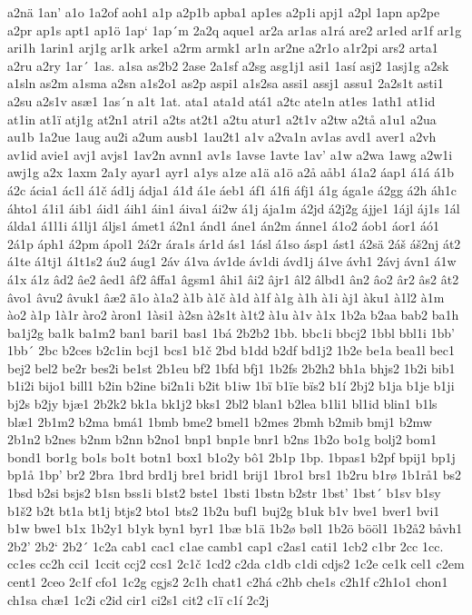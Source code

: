 a2nä
1an'
a1o
1a2of
aoh1
a1p
a2p1b
apba1
ap1es
a2p1i
apj1
a2pl
1apn
ap2pe
a2pr
ap1s
apt1
ap1ö
1ap`
1ap´m
2a2q
aque1
ar2a
ar1as
a1rá
are2
ar1ed
ar1f
ar1g
ari1h
1arin1
arj1g
ar1k
arke1
a2rm
armk1
ar1n
ar2ne
a2r1o
a1r2pi
ars2
arta1
a2ru
a2ry
1ar´
1as.
a1sa
as2b2
2ase
2a1sf
a2sg
asg1j1
asi1
1así
asj2
1asj1g
a2sk
a1sln
as2m
a1sma
a2sn
a1s2o1
as2p
aspi1
a1s2sa
assi1
assj1
assu1
2a2s1t
asti1
a2su
a2s1v
asæ1
1as´n
a1t
1at.
ata1
ata1d
atá1
a2tc
ate1n
at1es
1ath1
at1id
at1in
at1ï
atj1g
at2n1
atri1
a2ts
at2t1
a2tu
atur1
a2t1v
a2tw
a2tå
a1u1
a2ua
au1b
1a2ue
1aug
au2i
a2um
ausb1
1au2t1
a1v
a2va1n
av1as
avd1
aver1
a2vh
av1id
avie1
avj1
avjs1
1av2n
avnn1
av1s
1avse
1avte
1av'
a1w
a2wa
1awg
a2w1i
awj1g
a2x
1axm
2a1y
ayar1
ayr1
a1ys
a1ze
a1ä
a1ö
a2å
aåb1
á1a2
áap1
á1á
á1b
á2c
ácia1
ác1l
á1č
ád1j
ádja1
á1đ
á1e
áeb1
áf1
á1fi
áfj1
á1g
ága1e
á2gg
á2h
áh1c
áhto1
á1i1
áib1
áid1
áih1
áin1
áiva1
ái2w
á1j
ája1m
á2jd
á2j2g
ájje1
1ájl
áj1s
1ál
álda1
á1l1i
á1lj1
áljs1
ámet1
á2n1
ánd1
áne1
án2m
ánne1
á1o2
áob1
áor1
áó1
2á1p
áph1
á2pm
ápol1
2á2r
ára1s
ár1d
ás1
1ásl
á1so
ásp1
ást1
á2sä
2áš
áš2nj
át2
á1te
á1tj1
á1t1s2
áu2
áug1
2áv
á1va
áv1de
áv1di
ávd1j
á1ve
ávh1
2ávj
ávn1
á1w
á1x
á1z
âd2
âe2
âed1
âf2
âffa1
âgsm1
âhi1
âi2
âjr1
âl2
âlbd1
ân2
âo2
âr2
âs2
ât2
âvo1
âvu2
âvuk1
âæ2
ã1o
à1a2
à1b
à1č
à1d
à1f
à1g
à1h
à1i
àj1
àku1
à1l2
à1m
ào2
à1p
1à1r
àro2
àron1
1àsi1
à2sn
à2s1t
à1t2
à1u
à1v
à1x
1b2a
b2aa
bab2
ba1h
ba1j2g
ba1k
ba1m2
ban1
bari1
bas1
1bá
2b2b2
1bb.
bbc1i
bbcj2
1bbl
bbl1i
1bb'
1bb´
2bc
b2ces
b2c1in
bcj1
bcs1
b1č
2bd
b1dd
b2df
bd1j2
1b2e
be1a
bea1l
bec1
bej2
bel2
be2r
bes2i
be1st
2b1eu
bf2
1bfd
bfj1
1b2fs
2b2h2
bh1a
bhjs2
1b2i
bib1
b1i2i
bijo1
bill1
b2in
b2ine
bi2n1i
b2it
b1iw
1bï
b1ïe
bïs2
b1í
2bj2
b1ja
b1je
b1ji
bj2s
b2jy
bjæ1
2b2k2
bk1a
bk1j2
bks1
2bl2
blan1
b2lea
b1li1
bl1id
blin1
b1ls
blæ1
2b1m2
b2ma
bmá1
1bmb
bme2
bmel1
b2mes
2bmh
b2mib
bmj1
b2mw
2b1n2
b2nes
b2nm
b2nn
b2no1
bnp1
bnp1e
bnr1
b2ns
1b2o
bo1g
bolj2
bom1
bond1
bor1g
bo1s
bo1t
botn1
box1
b1o2y
bô1
2b1p
1bp.
1bpas1
b2pf
bpij1
bp1j
bp1å
1bp'
br2
2bra
1brd
brd1j
bre1
brid1
brij1
1bro1
brs1
1b2ru
b1rø
1b1rå1
bs2
1bsd
b2si
bsjs2
b1sn
bss1i
b1st2
bste1
1bsti
1bstn
b2str
1bst'
1bst´
b1sv
b1sy
b1š2
b2t
bt1a
bt1j
btjs2
bto1
bts2
1b2u
buf1
buj2g
b1uk
b1v
bve1
bver1
bvi1
b1w
bwe1
b1x
1b2y1
b1yk
byn1
byr1
1bæ
b1ä
1b2ø
bøl1
1b2ö
bööl1
1b2å2
båvh1
2b2'
2b2`
2b2´
1c2a
cab1
cac1
c1ae
camb1
cap1
c2as1
cati1
1cb2
c1br
2cc
1cc.
cc1es
cc2h
cci1
1ccit
ccj2
ccs1
2c1č
1cd2
c2da
c1db
c1di
cdjs2
1c2e
ce1k
cel1
c2em
cent1
2ceo
2c1f
cfo1
1c2g
cgjs2
2c1h
chat1
c2há
c2hb
che1s
c2h1f
c2h1o1
chon1
ch1sa
chæ1
1c2i
c2id
cir1
ci2s1
cit2
c1ï
c1í
2c2j
